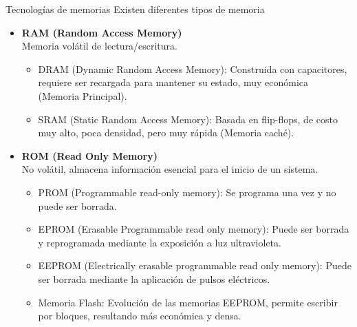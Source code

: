 \documentclass[aspectratio=169]{beamer}
\begin{document}
\begin{frame}[fragile,t]{Tecnologías de memorias}
    Existen diferentes tipos de memoria
    \begin{itemize}
    \item<1-> \textbf{RAM (Random Access Memory)}\\ Memoria volátil de lectura/escritura.
    \begin{itemize}
    \item \textcolor{naranjauca}{DRAM} (Dynamic Random Access Memory): Construida con capacitores, requiere ser recargada para mantener su estado, muy económica (Memoria Principal).
    \item \textcolor{naranjauca}{SRAM} (Static Random Access Memory): Basada en flip-flops, de costo muy alto, poca densidad, pero muy rápida (Memoria caché).
    \end{itemize}
    \item<2-> \textbf{ROM (Read Only Memory)}\\ No volátil, almacena información esencial para el inicio de un sistema.
    \begin{itemize}
    \item \textcolor{naranjauca}{PROM} (Programmable read-only memory): Se programa una vez y no puede ser borrada.
    \item \textcolor{naranjauca}{EPROM} (Erasable Programmable read only memory): Puede ser borrada y reprogramada mediante la exposición a luz ultravioleta.
    \item \textcolor{naranjauca}{EEPROM} (Electrically erasable programmable read only memory): Puede ser borrada mediante la aplicación de pulsos eléctricos.
    \item \textcolor{naranjauca}{Memoria Flash}: Evolución de las memorias EEPROM, permite escribir por bloques, resultando más económica y densa.
    \end{itemize}
    \end{itemize}
\end{frame}
\end{document}
